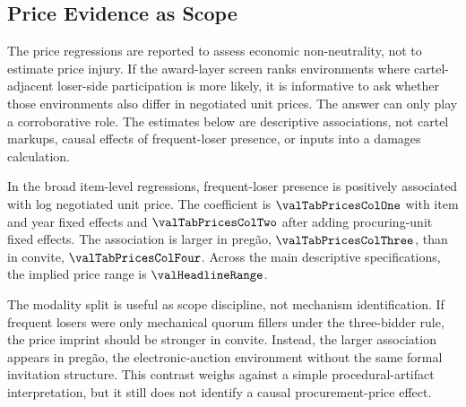 \subsection{Price Evidence as Scope}
\label{sec:price_imprint_submission}

The price regressions are reported to assess economic
non-neutrality, not to estimate price injury. If the award-layer
screen ranks environments where cartel-adjacent loser-side
participation is more likely, it is informative to ask whether
those environments also differ in negotiated unit prices. The
answer can only play a corroborative role. The estimates below
are descriptive associations, not cartel markups, causal effects
of frequent-loser presence, or inputs into a damages calculation.

In the broad item-level regressions, frequent-loser presence is
positively associated with log negotiated unit price. The
coefficient is $\valTabPricesColOne$ with item and year fixed
effects and $\valTabPricesColTwo$ after adding procuring-unit
fixed effects. The association is larger in pregão,
$\valTabPricesColThree$, than in convite, $\valTabPricesColFour$.
Across the main descriptive specifications, the implied price
range is $\valHeadlineRange$.

The modality split is useful as scope discipline, not mechanism
identification. If frequent losers were only mechanical quorum
fillers under the three-bidder rule, the price imprint should be
stronger in convite. Instead, the larger association appears in
pregão, the electronic-auction environment without the same formal
invitation structure. This contrast weighs against a simple
procedural-artifact interpretation, but it still does not identify
a causal procurement-price effect.

